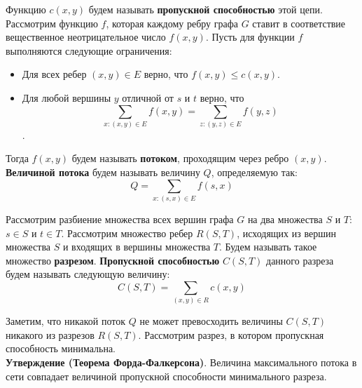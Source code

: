 \documentclass{article}
\begin{document}
Функцию $c(x, y)$ будем называть \textbf{пропускной способностью} этой цепи. \\

Рассмотрим функцию $f$, которая каждому ребру графа $G$ ставит в соответствие вещественное неотрицательное число $f(x, y)$. Пусть для функции $f$ выполняются следующие ограничения:

\begin{itemize}
	\item Для всех ребер $(x, y) \in E$ верно, что $f(x, y) \le c(x, y)$.
	\item Для любой вершины $y$ отличной от $s$ и $t$ верно, что $$\sum_{x : (x, y) \in E} f(x, y) = \sum_{z : (y, z) \in E} f(y, z)$$.
\end{itemize}  

Тогда $f(x, y)$ будем называть \textbf{потоком}, проходящим через ребро $(x, y)$. \textbf{Величиной потока} будем называть величину $Q$, определяемую так: $$Q = \sum_{x: (s, x) \in E} f(s, x) $$

Рассмотрим разбиение множества всех вершин графа $G$ на два множества $S$ и $T$: $s \in S$ и $t \in T$. Рассмотрим множество ребер $R(S, T)$, исходящих из вершин множества $S$ и входящих в вершины множества $T$. Будем называть такое множество \textbf{разрезом}. \textbf{Пропускной способностью} $C(S, T)$ данного разреза будем называть следующую величину: $$ C(S, T) = \sum_{(x, y) \in R} c(x, y) $$

Заметим, что никакой поток $Q$ не может превосходить величины $C(S, T)$ никакого из разрезов $R(S, T)$. Рассмотрим разрез, в котором пропускная способность минимальна. \\

\textbf{Утверждение (Теорема Форда-Фалкерсона)}. Величина максимального потока в сети совпадает величиной пропускной способности минимального разреза.
\end{document}
